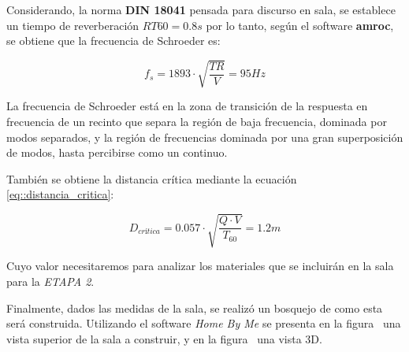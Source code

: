 \par Considerando, la norma \textbf{DIN 18041} pensada para discurso en sala, se establece un tiempo de reverberación $RT60 = 0.8s$ por lo tanto, según el software \textbf{amroc}, se obtiene que la frecuencia de Schroeder es:

\begin{equation}
    \boxed{f_s = 1893 \cdot \sqrt{\frac{TR}{V}} = 95Hz}
    \label{eq::freq_schroeder}
\end{equation}

\par La frecuencia de Schroeder está en la zona de transición de la respuesta en frecuencia de un recinto que separa la región de baja frecuencia, dominada por modos separados, y la región de frecuencias dominada por una gran superposición de modos, hasta percibirse como un continuo.

\par También se obtiene la distancia crítica mediante la ecuación \eqref{eq::distancia_critica}:

\begin{equation}
    \boxed{D_{crítica} = 0.057 \cdot \sqrt{ \frac{Q \cdot V}{T_{60}}}= 1.2m}
    \label{eq::distancia_critica}
\end{equation}

\par Cuyo valor necesitaremos para analizar los materiales que se incluirán en la sala para la \textit{ETAPA 2}.\\

\par Finalmente, dados las medidas de la sala, se realizó un bosquejo de como esta será construida. Utilizando el software \textit{Home By Me} se presenta en la figura~ una vista superior de la sala a construir, y en la figura ~una vista 3D.

